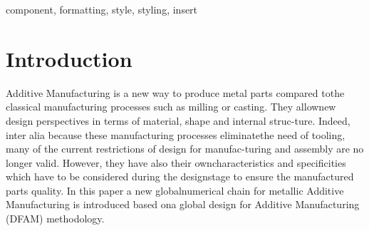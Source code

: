\documentclass[conference]{IEEEtran}
\begin{document}
\begin{IEEEkeywords}
	component, formatting, style, styling, insert
\end{IEEEkeywords}

\section{Introduction}
Additive Manufacturing is a new way to produce metal parts compared tothe classical manufacturing processes such as milling or casting. They allownew design perspectives in terms of material, shape and internal struc-ture. Indeed, inter alia because these manufacturing processes eliminatethe need of tooling, many of the current restrictions of design for manufac-turing and assembly are no longer valid. However, they have also their owncharacteristics and specificities which have to be considered during the designstage to ensure the manufactured parts quality. In this paper a new globalnumerical chain for metallic Additive Manufacturing is introduced based ona global design for Additive Manufacturing (DFAM) methodology.
\end{document}

